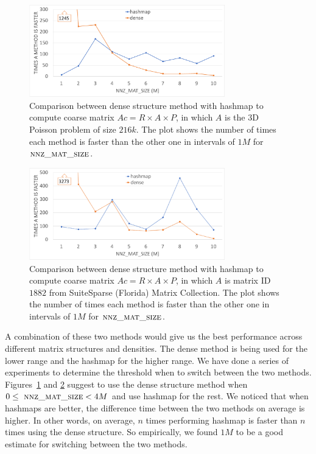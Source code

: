 \begin{figure}[tbh]
 \centering
 \includegraphics[width=8.5cm,height=4cm]{./figures/lap60_range.pdf}
 \caption{Comparison between dense structure method with hashmap to compute coarse matrix $Ac = R \times A \times P$, in which $A$ is the 3D Poisson problem of size $216k$. The plot shows the number of times each method is faster than the other one in intervals of $1M$ for $\textsc{nnz\_mat\_size}$.}
 \label{fig:lap60}
\end{figure}

\begin{figure}[tbh]
 \centering
 \includegraphics[width=8.5cm,height=4cm]{./figures/eco_range.pdf}
 \caption{Comparison between dense structure method with hashmap to compute coarse matrix $Ac = R \times A \times P$, in which $A$ is matrix ID $1882$ from SuiteSparse (Florida) Matrix Collection. The plot shows the number of times each method is faster than the other one in intervals of $1M$ for $\textsc{nnz\_mat\_size}$.}
 \label{fig:eco}
\end{figure}

A combination of these two methods would give us the best performance across different matrix structures and densities. The dense method is being used for the lower range and the hashmap for the higher range.
We have done a series of experiments to determine the threshold when to switch between the two methods. Figures~\ref{fig:lap60} and \ref{fig:eco} suggest to use the dense structure method when $0 \le\ \textsc{nnz\_mat\_size} < 4M$ and use hashmap for the rest. We noticed that when hashmaps are better, the difference time between the two methods on average is higher. In other words, on average, $n$ times performing hashmap is faster than $n$ times using the dense structure. So empirically, we found $1M$ to be a good estimate for switching between the two methods.

